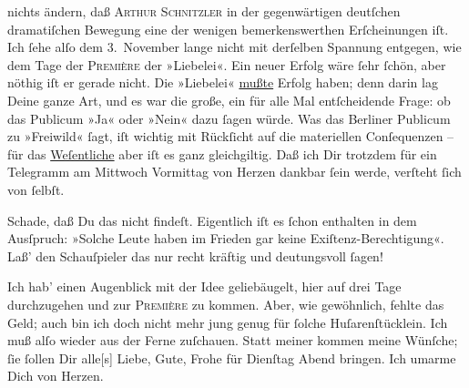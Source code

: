                nichts ändern, daß \textsc{Arthur Schnitzler} in der gegenwärtigen
               deutſchen dramatiſchen Bewegung eine der wenigen bemerkenswerthen Erſcheinungen iſt.
               Ich ſehe alſo dem 3. November lange nicht mit
               derſelben Spannung entgegen, wie dem Tage der \textsc{Première} der »Liebelei«. Ein neuer Erfolg wäre ſehr ſchön, aber nöthig iſt er gerade nicht.
               Die »Liebelei« \uline{mußte} Erfolg haben; denn {\pb}darin  lag Deine ganze Art, und es
               war die große, ein für alle Mal entſcheidende Frage:  ob das Publicum »Ja« oder »Nein« dazu ſagen würde. Was das Berliner Publicum zu »Freiwild« ſagt, iſt \strikeout{\textcolor{gray}{wig}} wichtig mit Rückſicht auf die materiellen Conſequenzen – für das \uline{Weſentliche} aber iſt es ganz gleichgiltig. Daß ich Dir
               trotzdem für ein Telegramm am Mittwoch{ }Vormittag von Herzen dankbar ſein werde, verſteht ſich von ſelbſt.\pend
           
\pstart
           {\pb}Schade, daß Du das \label{K_L02789-4v}\label{K_L02789-4} nicht findeſt.  Eigentlich iſt es  ſchon enthalten in dem Ausſpruch: »Solche Leute haben im Frieden gar
                  keine Exiſtenz-Berechtigung«. Laß’ den Schauſpieler das nur recht kräftig und deutungsvoll
               ſagen!\pend
           
\pstart
           Ich hab’ einen Augenblick mit der Idee geliebäugelt, hier auf drei Tage durchzugehen
               und zur \textsc{Première} zu kommen. Aber, wie gewöhnlich, fehlte
               das Geld; auch bin ich doch nicht mehr jung genug für ſolche Huſarenſtücklein. Ich
               muß alſo wieder aus der Ferne zuſchauen. Statt meiner kommen meine Wünſche; ſie
               ſollen Dir alle{[}s{]} Liebe, Gute, Frohe für Dienſtag{ }Abend bringen. Ich umarme Dich von Herzen.\pend
           
